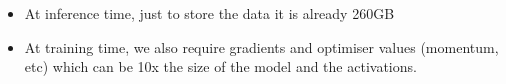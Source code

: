 \documentclass[11pt]{article}
\begin{document}
\begin{minipage}[l]{.5\linewidth}
    \begin{figure}[H]
        \centering
    \end{figure}    
\end{minipage}\hfill
\begin{minipage}[r]{.48\linewidth}
    \begin{itemize}
        \item At inference time, just to store the data it is already 260GB
        \item At training time, we also require gradients and optimiser values (momentum, etc) which can be 10x the size of the model and the activations.
    \end{itemize}
\end{minipage}
\end{document}
